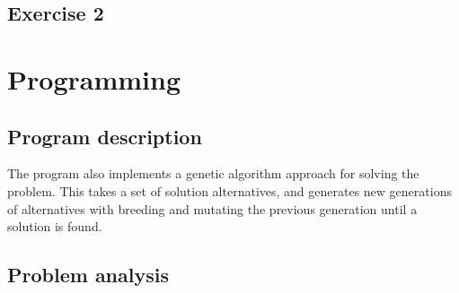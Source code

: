 \documentclass{article}
\begin{document}
\subsection*{Exercise 2}


\section*{Programming} 
\subsection*{Program description}
The program also implements a genetic algorithm approach for solving the problem. This takes a set of solution alternatives, and generates new generations of alternatives with breeding and mutating the previous generation until a solution is found.
\subsection*{Problem analysis}
\end{document}
